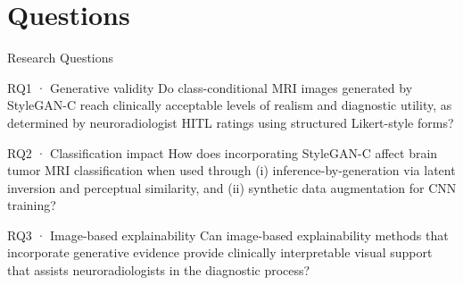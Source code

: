 \documentclass[aspectratio=169]{beamer}
\begin{document}
\section{Questions}
\begin{frame}{Research Questions}
  \footnotesize
  {%
  \begin{block}{RQ1 · Generative validity}
    Do class-conditional MRI images generated by StyleGAN-C
    reach clinically acceptable levels of realism and diagnostic utility,
    as determined by neuroradiologist HITL ratings using
    structured Likert-style forms?
  \end{block}}
  \vspace{-0.4em}
  {%
  \begin{block}{RQ2 · Classification impact}
    How does incorporating StyleGAN-C affect brain tumor MRI classification
    when used through (i) inference-by-generation via latent inversion and
    perceptual similarity, and (ii) synthetic data augmentation for CNN training?
  \end{block}}
  \vspace{-0.4em}
  {%
  \begin{block}{RQ3 · Image-based explainability}
    Can image-based explainability methods that incorporate generative evidence
    provide clinically interpretable visual support that assists
    neuroradiologists in the diagnostic process?
  \end{block}}
\end{frame}
\end{document}
